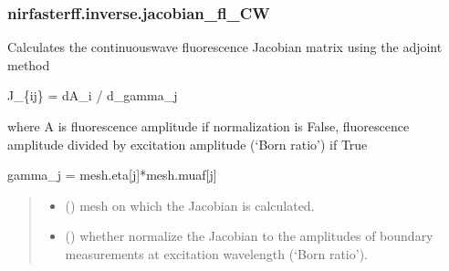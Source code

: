 \documentclass[letterpaper,10pt,english]{sphinxmanual}
\begin{document}
\sphinxstepscope


\subsubsection{nirfasterff.inverse.jacobian\_fl\_CW}
\label{\detokenize{_autosummary/nirfasterff.inverse.jacobian_fl_CW:nirfasterff-inverse-jacobian-fl-cw}}\label{\detokenize{_autosummary/nirfasterff.inverse.jacobian_fl_CW::doc}}

\begin{fulllineitems}
\label{\detokenize{_autosummary/nirfasterff.inverse.jacobian_fl_CW:nirfasterff.inverse.jacobian_fl_CW}}
\pysigstartsignatures
\pysiglinewithargsret
{}
{\sphinxparamcomma {}\sphinxparamcomma {}\sphinxparamcomma {}}
{}
\pysigstopsignatures
\sphinxAtStartPar
Calculates the continuous\sphinxhyphen{}wave fluorescence Jacobian matrix using the adjoint method

\sphinxAtStartPar
J\_\{ij\} = dA\_i / d\_gamma\_j

\sphinxAtStartPar
where A is fluorescence amplitude if normalization is False, fluorescence amplitude divided by excitation amplitude (‘Born ratio’) if True

\sphinxAtStartPar
gamma\_j = mesh.eta{[}j{]}*mesh.muaf{[}j{]}
\begin{quote}\begin{description}
\begin{itemize}
\item {} 
\sphinxAtStartPar
{} () \textendash{} mesh on which the Jacobian is calculated.

\item {} 
\sphinxAtStartPar
{} (\sphinxstyleliteralemphasis{\sphinxupquote{, }}) \textendash{} 
\sphinxAtStartPar
whether normalize the Jacobian to the amplitudes of boundary measurements at excitation wavelength (‘Born ratio’).


\end{itemize}
\end{description}
\end{quote}
\end{fulllineitems}
\end{document}
